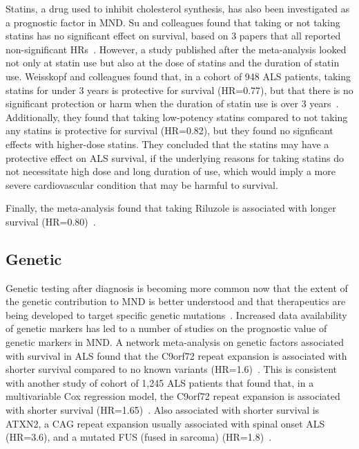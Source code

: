 Statins, a drug used to inhibit cholesterol synthesis, has also been investigated as a prognostic factor in MND.
Su and colleagues found that taking or not taking statins has no significant effect on survival, based on 3 papers that all reported non-significant HRs~\cite{suPredictorsSurvivalPatients2021}.
However, a study published after the meta-analysis looked not only at statin use but also at the dose of statins and the duration of statin use.
Weisskopf and colleagues found that, in a cohort of 948 ALS patients, taking statins for under 3 years is protective for survival (HR=0.77), but that there is no significant protection or harm when the duration of statin use is over 3 years~\cite{weisskopfStatinMedicationsAmyotrophic2022}.
Additionally, they found that taking low-potency statins compared to not taking any statins is protective for survival (HR=0.82), but they found no signficant effects with higher-dose statins.
They concluded that the statins may have a protective effect on ALS survival, if the underlying reasons for taking statins do not necessitate high dose and long duration of use, which would imply a more severe cardiovascular condition that may be harmful to survival.

Finally, the meta-analysis found that taking Riluzole is associated with longer survival (HR=0.80)~\cite{suPredictorsSurvivalPatients2021}.

\subsection{Genetic}

Genetic testing after diagnosis is becoming more common now that the extent of the genetic contribution to MND is better understood and that therapeutics are being developed to target specific genetic mutations~\cite{efnstaskforceondiagnosisandmanagementofamyotrophiclateralsclerosis:EFNSGuidelinesClinical2012}.
Increased data availability of genetic markers has led to a number of studies on the prognostic value of genetic markers in MND.
A network meta-analysis on genetic factors associated with survival in ALS found that the C9orf72 repeat expansion is associated with shorter survival compared to no known variants (HR=1.6)~\cite{suGeneticFactorsSurvival2022}.
This is consistent with another study of cohort of 1,245 ALS patients that found that, in a multivariable Cox regression model, the C9orf72 repeat expansion is associated with shorter survival (HR=1.65)~\cite{chioAssociationCopresencePathogenic2023}.
Also associated with shorter survival is ATXN2, a CAG repeat expansion usually associated with spinal onset ALS (HR=3.6), and a mutated FUS (fused in sarcoma) (HR=1.8)~\cite{suGeneticFactorsSurvival2022}.

